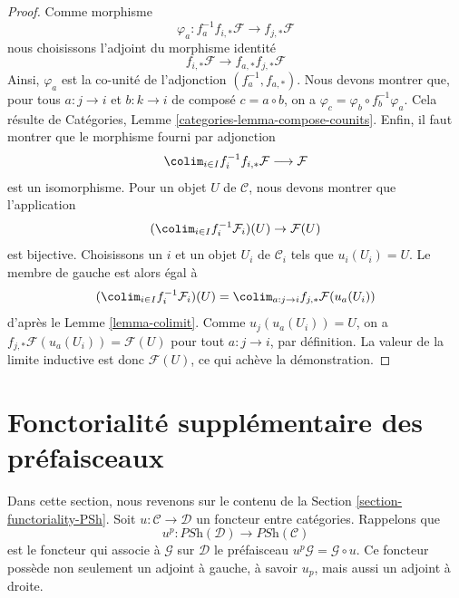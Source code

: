 \begin{proof}
Comme morphisme
$$
\varphi_a : f_a^{-1}f_{i, *}\mathcal{F} \to f_{j, *}\mathcal{F}
$$
nous choisissons l’adjoint du morphisme identité
$$
f_{i, *}\mathcal{F} \to f_{a, *}f_{j, *}\mathcal{F}
$$
Ainsi, $\varphi_a$ est la co-unité de l’adjonction
$(f_a^{-1}, f_{a, *})$. Nous devons montrer que, pour tous
$a : j \to i$ et $b : k \to i$ de composé $c = a \circ b$, on a
$\varphi_c = \varphi_b \circ f_b^{-1}\varphi_a$.
Cela résulte de Catégories, Lemme \ref{categories-lemma-compose-counits}.
Enfin, il faut montrer que le morphisme fourni par adjonction
$$
\colim_{i \in I} f_i^{-1}f_{i, *}\mathcal{F}
\longrightarrow
\mathcal{F}
$$
est un isomorphisme. Pour un objet $U$ de $\mathcal{C}$,
nous devons montrer que l’application
$$
(\colim_{i \in I} f_i^{-1}\mathcal{F}_i)(U) \to \mathcal{F}(U)
$$
est bijective. Choisissons un $i$ et un objet $U_i$ de $\mathcal{C}_i$
tels que $u_i(U_i) = U$. Le membre de gauche est alors égal à
$$
(\colim_{i \in I} f_i^{-1}\mathcal{F}_i)(U) =
\colim_{a : j \to i} f_{j, *}\mathcal{F}(u_a(U_i))
$$
d’après le Lemme \ref{lemma-colimit}. Comme $u_j(u_a(U_i)) = U$,
on a $f_{j, *}\mathcal{F}(u_a(U_i)) = \mathcal{F}(U)$
pour tout $a : j \to i$, par définition. La valeur de la limite inductive
est donc $\mathcal{F}(U)$, ce qui achève la démonstration.
\end{proof}











\section{Fonctorialité supplémentaire des préfaisceaux}
\label{section-more-functoriality-PSh}

\noindent
Dans cette section, nous revenons sur le contenu de la
Section \ref{section-functoriality-PSh}.
Soit $u : \mathcal{C} \to \mathcal{D}$ un foncteur entre catégories.
Rappelons que
$$
u^p :
\textit{PSh}(\mathcal{D})
\longrightarrow
\textit{PSh}(\mathcal{C})
$$
est le foncteur qui associe à $\mathcal{G}$ sur $\mathcal{D}$ le préfaisceau
$u^p\mathcal{G} = \mathcal{G} \circ u$. Ce foncteur possède non seulement
un adjoint à gauche, à savoir $u_p$, mais aussi un adjoint à droite.

